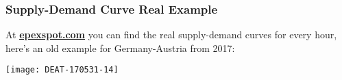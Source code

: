 \documentclass[10pt,aspectratio=169,dvipsnames]{beamer}
\begin{document}
\begin{frame}[fragile]
  \frametitle{Supply-Demand Curve Real Example}

  At \href{https://www.epexspot.com/en/market-data?market_area=AT&trading_date=2020-06-04&delivery_date=2020-06-05&underlying_year=&modality=Auction&sub_modality=DayAhead&product=60&data_mode=aggregated&period=}{\bf\color{blue}\underline{epexspot.com}} you can find the real supply-demand curves for every hour, here's an old example for Germany-Austria from 2017:

  \centering
    \texttt{[image: DEAT-170531-14]}

\end{frame}
\end{document}
